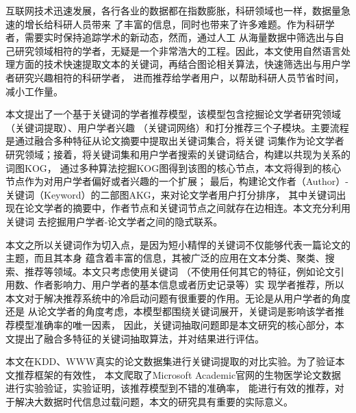 ﻿\begin{cabstract}
互联网技术迅速发展，各行各业的数据都在指数膨胀，科研领域也一样，数据量急速的增长给科研人员带来%
了丰富的信息，同时也带来了许多难题。作为科研学者，需要实时保持追踪学术的新动态，然而，通过人工%
从海量数据中筛选出与自己研究领域相符的学者，无疑是一个非常浩大的工程。因此，本文使用自然语言处%
理方面的技术快速提取文本的关键词，再结合图论相关算法，快速筛选出与用户学者研究兴趣相符的科研学者，%
进而推荐给学者用户，以帮助科研人员节省时间，减小工作量。%

本文提出了一个基于关键词的学者推荐模型，该模型包含挖掘论文学者研究领域（关键词提取）、用户学者兴趣%
（关键词网络）和打分推荐三个子模块。主要流程是通过融合多种特征从论文摘要中提取出关键词集合，将关键%
词集作为论文学者研究领域；接着，将关键词集和用户学者搜索的关键词结合，构建以共现为关系的词图KOG，%
通过多种算法挖掘KOG图得到该图的核心节点，本文将得到的核心节点作为对用户学者偏好或者兴趣的一个扩展；%
最后，构建论文作者（Author）-关键词（Keyword）的二部图AKG，来对论文学者用户打分排序，%
其中关键词出现在论文学者的摘要中，作者节点和关键词节点之间就存在边相连。本文充分利用关键词%
去挖掘用户学者-论文学者之间的隐式联系。%

本文之所以关键词作为切入点，是因为短小精悍的关键词不仅能够代表一篇论文的主题，而且其本身%
蕴含着丰富的信息，其被广泛的应用在文本分类、聚类、搜索、推荐等领域。本文只考虑使用关键词%
（不使用任何其它的特征，例如论文引用数、作者影响力、用户学者的基本信息或者历史记录等）实%
现学者推荐，所以本文对于解决推荐系统中的冷启动问题有很重要的作用。无论是从用户学者的角度还是%
从论文学者的角度考虑，本模型都围绕关键词展开，关键词是影响该学者推荐模型准确率的唯一因素，%
因此，关键词抽取问题即是本文研究的核心部分，本文提出了融合多特征的关键词抽取算法，并对结果进行评估。%

本文在KDD、WWW真实的论文数据集进行关键词提取的对比实验。为了验证本文推荐框架的有效性，%
本文爬取了Microsoft
Academic官网的生物医学论文数据进行实验验证，实验证明，该推荐模型到不错的准确率，%
能进行有效的推荐，对于解决大数据时代信息过载问题，本文的研究具有重要的实际意义。

\end{cabstract}

\begin{eabstract}
  
\end{eabstract}

